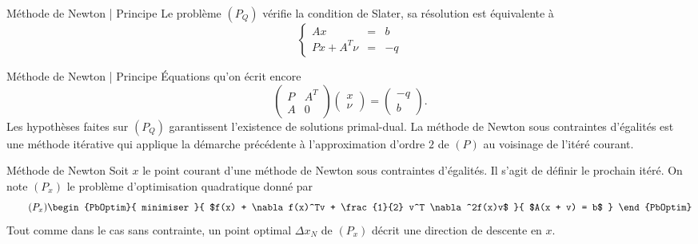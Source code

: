 \documentclass[aspectratio = 169]{beamer}
\begin{document}
\begin{frame}{Méthode de Newton | Principe}
  Le problème $(P_Q)$ vérifie la condition de Slater, sa résolution
  est équivalente à
  \begin{equation}
    \label{KKT-PQ}
    \tag{KKT-$P_Q$}
    \left\{
      \begin{array}{ccc}
        Ax & = & b \\
        Px + A^T\nu & = & -q
      \end{array}
    \right.
  \end{equation}
\end{frame}

\begin{frame}{Méthode de Newton | Principe}
  Équations qu'on écrit encore
  \begin{equation}
    \label{KKT-PQb}
    \tag{KKT-$P_Q$}
    \begin{pmatrix}
      P & A^T \\
      A & 0
    \end{pmatrix}
    \begin{pmatrix}
      x \\ \nu
    \end{pmatrix}
    =
    \begin{pmatrix}
      -q \\ b
    \end{pmatrix}.
  \end{equation}
  Les hypothèses faites sur $(P_Q)$ garantissent l'existence de
  solutions primal-dual. \pause La méthode de Newton sous contraintes
  d'égalités est une méthode itérative qui applique la démarche
  précédente à l'approximation d'ordre $2$ de $(P)$ au voisinage de
  l'itéré courant.
\end{frame}

\begin{frame}{Méthode de Newton}
  Soit $x$ le point courant d'une méthode de Newton sous contraintes
  d'égalités. Il s'agit de définir le prochain itéré. \pause On note
  $(P_x)$ le problème d'optimisation quadratique donné par
  \begin{equation}
    \label{Px}
    \tag{$P_x$}
    \begin{PbOptim}{
        minimiser
      }{
        $f(x) + \nabla f(x)^Tv + \frac{1}{2} v^T \nabla^2f(x)v$
      }{
        $A(x + v) = b$
      }
    \end{PbOptim}
  \end{equation}
  \pause Tout comme dans le cas sans contrainte, un point optimal
  $\Delta x_N$ de $(P_x)$ décrit une direction de descente en $x$.
\end{frame}
\end{document}
